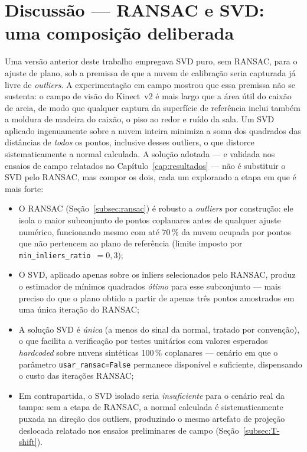 \section{Discussão — RANSAC e SVD: uma composição deliberada}
\label{sec:discussao-svd}

Uma versão anterior deste trabalho empregava SVD puro, sem RANSAC, para
o ajuste de plano, sob a premissa de que a nuvem de calibração seria
capturada já livre de \textit{outliers}. A experimentação em
campo mostrou que essa premissa não se sustenta: o campo de visão do
Kinect~v2 é mais largo que a área útil do caixão de areia, de modo que
qualquer captura da superfície de referência inclui também a moldura de
madeira do caixão, o piso ao redor e ruído da sala. Um SVD aplicado
ingenuamente sobre a nuvem inteira minimiza a soma dos quadrados das
distâncias de \emph{todos} os pontos, inclusive desses outliers, o que
distorce sistematicamente a normal calculada. A solução adotada — e
validada nos ensaios de campo relatados no
Capítulo~\ref{cap:resultados} — não é substituir o SVD pelo RANSAC, mas
compor os dois, cada um explorando a etapa em que é mais forte:

\begin{itemize}
    \item O RANSAC (Seção~\ref{subsec:ransac}) é robusto a
          \textit{outliers} por construção: ele isola o maior
          subconjunto de pontos coplanares antes de qualquer ajuste
          numérico, funcionando mesmo com até $70\,\%$ da nuvem
          ocupada por pontos que não pertencem ao plano de referência
          (limite imposto por \texttt{min\_inliers\_ratio}~$= 0{,}3$);
    \item O SVD, aplicado apenas sobre os inliers
          selecionados pelo RANSAC, produz o estimador de mínimos
          quadrados \emph{ótimo} para esse subconjunto — mais preciso
          do que o plano obtido a partir de apenas três pontos
          amostrados em uma única iteração do RANSAC;
    \item A solução SVD é \emph{única} (a menos do sinal da normal,
          tratado por convenção), o que facilita a verificação por
          testes unitários com valores esperados \emph{hardcoded}
          sobre nuvens sintéticas 100\,\% coplanares — cenário em que
          o parâmetro \texttt{usar\_ransac=False} permanece disponível
          e suficiente, dispensando o custo das iterações RANSAC;
    \item Em contrapartida, o SVD isolado seria \emph{insuficiente}
          para o cenário real da tampa: sem a etapa de RANSAC, a
          normal calculada é sistematicamente puxada na direção dos
          outliers, produzindo o mesmo artefato de projeção deslocada
          relatado nos ensaios preliminares de campo
          (Seção~\ref{subsec:T-shift}).
\end{itemize}

